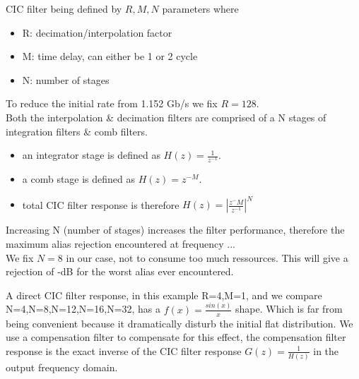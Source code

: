 \documentclass{article}
\begin{document}
CIC filter being defined by $R, M, N$ parameters where

\begin{itemize}
	\item R: decimation/interpolation factor
	\item M: time delay, can either be 1 or 2 cycle
	\item N: number of stages
\end{itemize}

\vspace{0.2cm}
To reduce the initial rate from 1.152 Gb/s we fix
$R = 128$. \\

Both the interpolation \& decimation filters
are comprised of a N stages of integration filters
\& comb filters.


\begin{itemize}
	\item an integrator stage is defined as $H(z) = \frac{1}{z^{-1}}$.\\
	\item a comb stage is defined as $H(z) = z^{-M}$.\\
	\item total CIC filter response is therefore $H(z) = \left| \frac{z^-M}{z^{-1}} \right|^N$
\end{itemize}

Increasing N (number of stages) increases the filter performance,
therefore the maximum alias rejection encountered at frequency ... \\

We fix $N=8$ in our case, not to consume too much ressources.
This will give a rejection of
-dB for the worst alias ever encountered.

A direct CIC filter response, in this example R=4,M=1, and we compare
N=4,N=8,N=12,N=16,N=32, has a $f(x) = \frac{sin(x)}{x}$ shape.
Which is far from being convenient because it dramatically disturb
the initial flat distribution. We use a compensation filter
to compensate for this effect,
the compensation filter response is the exact inverse
of the CIC filter response $G(z) = \frac{1}{H(z)}$ 
in the output frequency domain.
\end{document}
